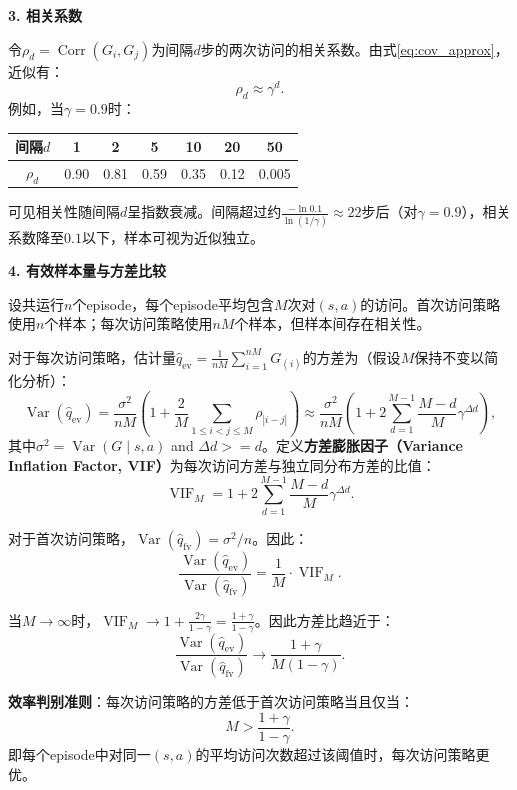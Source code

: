 \documentclass[UTF8]{article}
\begin{document}
\begin{remarkbox}
\smallskip
\noindent\textbf{3. 相关系数}

令$\rho_d = \operatorname{Corr}(G_i, G_j)$为间隔$d$步的两次访问的相关系数。由式\eqref{eq:cov_approx}，近似有：
\[
\rho_d \approx \gamma^d.
\]
例如，当$\gamma = 0.9$时：
\begin{center}
\begin{tabular}{c|cccccc}
\hline
间隔$d$ & 1 & 2 & 5 & 10 & 20 & 50 \\
\hline
$\rho_d$ & 0.90 & 0.81 & 0.59 & 0.35 & 0.12 & 0.005 \\
\hline
\end{tabular}
\end{center}
可见相关性随间隔$d$呈指数衰减。间隔超过约$\frac{-\ln 0.1}{\ln(1/\gamma)} \approx 22$步后（对$\gamma=0.9$），相关系数降至$0.1$以下，样本可视为近似独立。

\smallskip
\noindent\textbf{4. 有效样本量与方差比较}

设共运行$n$个episode，每个episode平均包含$M$次对$(s,a)$的访问。首次访问策略使用$n$个样本；每次访问策略使用$nM$个样本，但样本间存在相关性。

对于每次访问策略，估计量$\hat{q}_{\text{ev}} = \frac{1}{nM} \sum_{i=1}^{nM} G_{(i)}$的方差为（假设$M$保持不变以简化分析）：
\begin{equation}
\label{eq:var_every}
\operatorname{Var}(\hat{q}_{\text{ev}})
= \frac{\sigma^2}{nM} \left(1 + \frac{2}{M} \sum_{1 \le i < j \le M} \rho_{|i-j|}\right)
\approx \frac{\sigma^2}{nM} \left(1 + 2\sum_{d=1}^{M-1} \frac{M-d}{M} \gamma^{\Delta d}\right),
\end{equation}
其中$\sigma^2 = \operatorname{Var}(G \mid s,a)$ and $\Delta d >=d$。定义\textbf{方差膨胀因子（Variance Inflation Factor, VIF）}为每次访问方差与独立同分布方差的比值：
\[
\operatorname{VIF}_M = 1 + 2\sum_{d=1}^{M-1} \frac{M-d}{M} \gamma^{\Delta d}.
\]

对于首次访问策略，$\operatorname{Var}(\hat{q}_{\text{fv}}) = \sigma^2 / n$。因此：
\begin{equation}
\label{eq:var_ratio}
\frac{\operatorname{Var}(\hat{q}_{\text{ev}})}{\operatorname{Var}(\hat{q}_{\text{fv}})}
= \frac{1}{M} \cdot \operatorname{VIF}_M.
\end{equation}

当$M \to \infty$时，$\operatorname{VIF}_M \to 1 + \frac{2\gamma}{1-\gamma} = \frac{1+\gamma}{1-\gamma}$。因此方差比趋近于：
\[
\frac{\operatorname{Var}(\hat{q}_{\text{ev}})}{\operatorname{Var}(\hat{q}_{\text{fv}})} \to \frac{1+\gamma}{M(1-\gamma)}.
\]

\textbf{效率判别准则}：每次访问策略的方差低于首次访问策略当且仅当：
\[
M > \frac{1+\gamma}{1-\gamma}.
\]
即每个episode中对同一$(s,a)$的平均访问次数超过该阈值时，每次访问策略更优。


\end{remarkbox}
\end{document}
